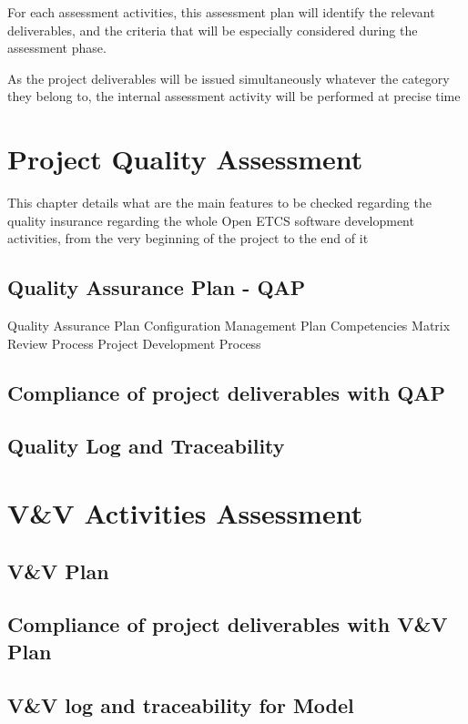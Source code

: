 \documentclass{template/openetcs_report}
\begin{document}
For each assessment activities, this assessment plan will identify the relevant deliverables, and the criteria that will be especially considered during the assessment phase.

As the project deliverables will be issued simultaneously whatever the category they belong to, the internal assessment activity will be performed at precise time

\chapter{Project Quality Assessment}
This chapter details what are the main features to be checked regarding the quality insurance regarding the whole Open ETCS software development activities, from the very beginning of the project to the end of it

\section{Quality Assurance Plan - QAP}

Quality Assurance Plan
Configuration Management Plan
Competencies Matrix
Review Process
Project Development Process

\section{Compliance of project deliverables with QAP}

\section{Quality Log and Traceability}


\chapter{V\&V Activities Assessment}

\section{V\&V Plan}

\section{Compliance of project deliverables with V\&V Plan}

\section{V\&V log and traceability for Model}
\end{document}
